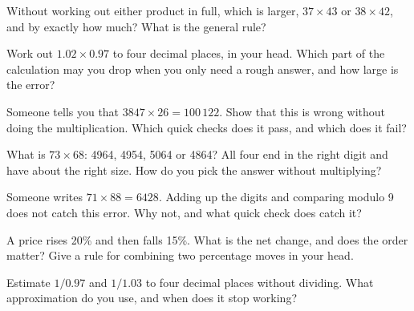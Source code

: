 \begin{question}\label{iq:iv1:mental-technique:19}
Without working out either product in full, which is larger, $37 \times 43$ or $38 \times 42$, and by exactly how much? What is the general rule?
\end{question}

\begin{question}\label{iq:iv1:mental-technique:20}
Work out $1.02 \times 0.97$ to four decimal places, in your head. Which part of the calculation may you drop when you only need a rough answer, and how large is the error?
\end{question}

\begin{question}\label{iq:iv1:mental-technique:21}
Someone tells you that $3847 \times 26 = 100\,122$. Show that this is wrong without doing the multiplication. Which quick checks does it pass, and which does it fail?
\end{question}

\begin{question}\label{iq:iv1:mental-technique:22}
What is $73 \times 68$: 4964, 4954, 5064 or 4864? All four end in the right digit and have about the right size. How do you pick the answer without multiplying?
\end{question}

\begin{question}\label{iq:iv1:mental-technique:23}
Someone writes $71 \times 88 = 6428$. Adding up the digits and comparing modulo 9 does not catch this error. Why not, and what quick check does catch it?
\end{question}

\begin{question}\label{iq:iv1:mental-technique:24}
A price rises 20\% and then falls 15\%. What is the net change, and does the order matter? Give a rule for combining two percentage moves in your head.
\end{question}

\begin{question}\label{iq:iv1:mental-technique:25}
Estimate $1/0.97$ and $1/1.03$ to four decimal places without dividing. What approximation do you use, and when does it stop working?
\end{question}

